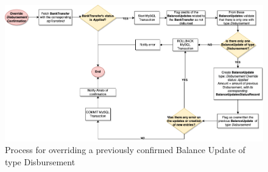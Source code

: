 \begin{figure} [h]
    \centering
    \includegraphics[scale = 0.4]{assets/diagrams/OverrideDisbursement.drawio.png}
    \caption{Process for overriding a previously confirmed Balance Update of type Disbursement}\label{fig:override_disbursement}
\end{figure}

